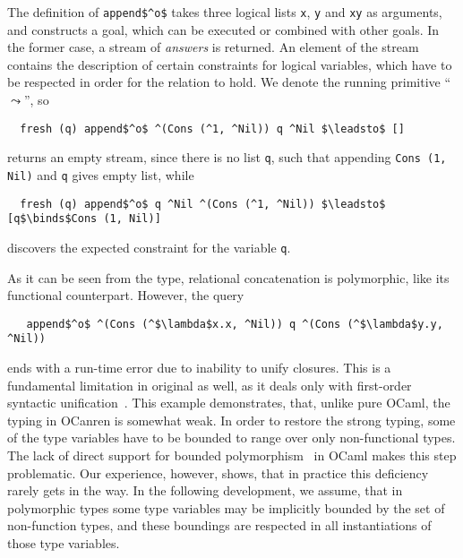 The definition of \lstinline{append$^o$} takes three logical lists \lstinline{x}, \lstinline{y} and \lstinline{xy} as arguments, and constructs a goal,
which can be executed or combined with other goals. In the former case, a stream of \emph{answers} is returned. An element of the stream contains the description
of certain constraints for logical variables, which have to be respected in order for the relation to hold. We denote the running primitive ``$\leadsto$'', so

\begin{lstlisting}
  fresh (q) append$^o$ ^(Cons (^1, ^Nil)) q ^Nil $\leadsto$ []
\end{lstlisting}

\noindent returns an empty stream, since there is no list \lstinline{q}, such that appending \lstinline{Cons (1, Nil)} and \lstinline{q} gives empty list, while

\begin{lstlisting}
  fresh (q) append$^o$ q ^Nil ^(Cons (^1, ^Nil)) $\leadsto$ [q$\binds$Cons (1, Nil)]
\end{lstlisting}

\noindent discovers the expected constraint for the variable \lstinline{q}.

As it can be seen from the type, relational concatenation is polymorphic, like its functional counterpart. However, the query

\begin{lstlisting}
   append$^o$ ^(Cons (^$\lambda$x.x, ^Nil)) q ^(Cons (^$\lambda$y.y, ^Nil))  
\end{lstlisting}

\noindent ends with a run-time error due to inability to unify closures. This is a fundamental limitation in original \miniKanren as well,
as it deals only with first-order syntactic unification~\cite{Unification}. This example demonstrates, that, unlike pure OCaml, the typing
in OCanren is somewhat weak. In order to restore the strong typing, some of the type variables have to be bounded to range over only non-functional
types. The lack of direct support for bounded polymorphism~\cite{cardelli} in OCaml makes this step problematic. Our experience, however, shows, that
in practice this deficiency rarely gets in the way. In the following development, we assume, that in polymorphic types some type variables may be
implicitly bounded by the set of non-function types, and these boundings are respected in all instantiations of those type variables.

